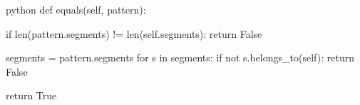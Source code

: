 \begin{mintedbox}{python}       
def equals(self, pattern):

    if len(pattern.segments) != len(self.segments):
        return False

    segments = pattern.segments
    for s in segments:
        if not s.belongs_to(self):
            return False
    
    return True
\end{mintedbox}